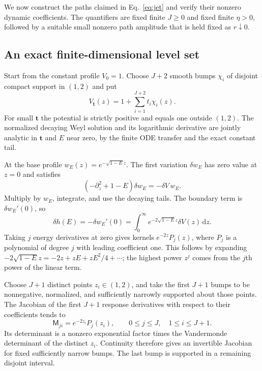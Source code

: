 \documentclass[aps,pra,reprint,superscriptaddress,longbibliography]{revtex4-2}
\newcommand{\dd}{\mathrm d}
\begin{document}
We now construct the paths claimed in Eq.~\eqref{eq:jet} and verify
their nonzero dynamic coefficients. The quantifiers are fixed finite
$J\ge0$ and fixed finite $\eta>0$, followed by a suitable small nonzero
path amplitude that is held fixed as $r\downarrow0$.

\subsection{An exact finite-dimensional level set}

Start from the constant profile $V_0=1$. Choose $J+2$ smooth bumps
$\chi_i$ of disjoint compact support in $(1,2)$ and put
\begin{equation}
 V_{\bm t}(z)=1+\sum_{i=1}^{J+2}t_i\chi_i(z).
 \label{eq:corebumppotentials}
\end{equation}
For small $\bm t$ the potential is strictly positive and equals one
outside $(1,2)$. The normalized decaying Weyl solution and its
logarithmic derivative are jointly analytic in $\bm t$ and $E$ near
zero, by the finite ODE transfer and the exact constant tail.

At the base profile $w_E(z)=e^{-\sqrt{1-E}z}$. The first variation
$\delta w_E$ has zero value at $z=0$ and satisfies
\begin{equation}
 (-\partial_z^2+1-E)\delta w_E=-\delta V\,w_E.
 \label{eq:corelinearizedweylode}
\end{equation}
Multiply by $w_E$, integrate, and use the decaying tails. The boundary
term is $\delta w_E'(0)$, so
\begin{equation}
 \delta h(E)=-\delta w_E'(0)
   =\int_0^\infty e^{-2\sqrt{1-E}z}\delta V(z)\,\dd z.
 \label{eq:coreweylvariation}
\end{equation}
Taking $j$ energy derivatives at zero gives kernels
$e^{-2z}P_j(z)$, where $P_j$ is a polynomial of degree $j$ with leading
coefficient one. This follows by expanding
$-2\sqrt{1-E}z=-2z+zE+zE^2/4+\cdots$; the highest power $z^j$
comes from the $j$th power of the linear term.

Choose $J+1$ distinct points $z_i\in(1,2)$, and take the first
$J+1$ bumps to be nonnegative, normalized, and sufficiently narrowly
supported about those points. The Jacobian of the first $J+1$
response derivatives with respect to their coefficients tends to
\begin{equation}
 \mathsf M_{ji}=e^{-2z_i}P_j(z_i),\qquad
 0\le j\le J,\quad1\le i\le J+1.
 \label{eq:corevandermondematrix}
\end{equation}
Its determinant is a nonzero exponential factor times the Vandermonde
determinant of the distinct $z_i$. Continuity therefore gives an
invertible Jacobian for fixed sufficiently narrow bumps. The last
bump is supported in a remaining disjoint interval.
\end{document}
